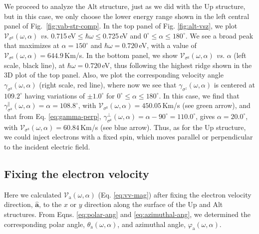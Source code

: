 \documentclass[floatfix,prb,aps,superscriptaddress,showpacs,11pt,preprint,letterpaper]{revtex4}
\begin{document}
We proceed to analyze the Alt structure, just as we did with the Up structure,
but in this case, we only choose the lower energy range shown in the left
central panel of Fig.~\ref{fig:vab-str-comp}. In the top panel of Fig. 
\ref{fig:alt-vsz}, we plot $\mathcal{V}_{\sigma^{\mathrm{z}}} (\omega,\alpha)$
{\it vs.} 0.715\,eV$\leq\hbar\omega\leq$0.725\,eV and $0^\circ\leq\alpha\leq
180^\circ$. We see a broad peak that maximizes at $\alpha=150^{\circ}$ and
$\hbar\omega= 0.720$\,eV, with a value of
$\mathcal{V}_{\sigma^{\mathrm{z}}}(\omega,\alpha) = 644.9$\,Km/s. In the bottom
panel, we  show $\mathcal{V}_{\sigma^{\mathrm{z}}} (\omega,\alpha)$ {\it vs.}
$\alpha$ (left scale, black line), at $\hbar\omega= 0.720$\,eV, thus following
the highest ridge shown in the 3D plot of the top panel. Also, we plot the
corresponding velocity angle $\gamma_{\sigma^\mathrm{z}} (\omega,\alpha)$
(right scale, red line), where now we see that
$\gamma_{\sigma^z}(\omega,\alpha)$ is centered at $109.2^{\circ}$ having
variations of $\pm 1.0^{\circ}$ for $0^{\circ} \leq
\alpha \leq 180^{\circ}$. In this case, we find that
$\gamma^\parallel_{\sigma^\mathrm{z}} (\omega,\alpha) =
\alpha = 108.8^\circ$, with $\mathcal{V}_{\sigma^{\mathrm{z}}} (\omega,\alpha)
= 450.05$\,Km/s (see green arrow), and that from Eq. \eqref{eq:gamma-perp},
$\gamma^\perp_{\sigma^\mathrm{z}}(\omega,\alpha)=\alpha-90^\circ=110.0^\circ$,
gives $\alpha=20.0^\circ$, with $\mathcal{V}_{\sigma^{\mathrm{z}}}
(\omega,\alpha) = 60.84$\,Km/s (see blue arrow). Thus, as for the Up structure,
we could inject electrons with a fixed spin, which moves parallel or
perpendicular to the incident electric field.

\subsection{Fixing the electron velocity} 
\label{sec:res-fixvel}

Here we calculated $\mathcal{V}_{\mathrm{a}}(\omega,\alpha)$ (Eq. 
\eqref{eq:vv-mag}) after fixing the electron velocity direction, $\hat{\mathbf{a}}$,
to the $x$ or $y$ direction along the surface of the Up and Alt structures.
From Eqns. \eqref{eq:polar-ang} and \eqref{eq:azimuthal-ang}, 
we
determined the corresponding polar angle, $\theta_{\mathrm{a}}
(\omega,\alpha)$, and azimuthal angle, $\varphi_{\mathrm{a}} (\omega,\alpha)$.
\end{document}
